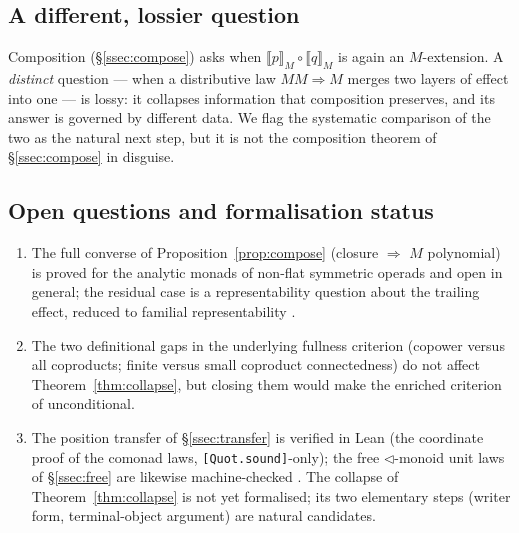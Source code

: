 \documentclass[11pt]{amsart}
\theoremstyle{plain}
\theoremstyle{definition}
\theoremstyle{remark}
\newcommand{\extM}[1]{\llbracket #1 \rrbracket_{M}}
\newcommand{\tri}{\triangleleft}
\begin{document}
\subsection*{A different, lossier question}
Composition (\S\ref{ssec:compose}) asks when $\extM{p}\circ\extM{q}$ is again an $M$-extension. A
\emph{distinct} question --- when a distributive law $MM\Rightarrow M$ merges two layers of effect into
one --- is lossy: it collapses information that composition preserves, and its answer is governed by
different data. We flag the systematic comparison of the two as the natural next step, but it is not
the composition theorem of \S\ref{ssec:compose} in disguise.

\subsection*{Open questions and formalisation status}
\begin{enumerate}[label=(\arabic*),leftmargin=2.2em]
  \item The full converse of Proposition~\ref{prop:compose} (closure $\Rightarrow$ $M$ polynomial) is
    proved for the analytic monads of non-flat symmetric operads and open in general; the residual
    case is a representability question about the trailing effect, reduced to familial
    representability \cite{MacBethCodensity}.
  \item The two definitional gaps in the underlying fullness criterion (copower versus all
    coproducts; finite versus small coproduct connectedness) do not affect
    Theorem~\ref{thm:collapse}, but closing them would make the enriched criterion of
    \cite{MacBethBase} unconditional.
  \item The position transfer of \S\ref{ssec:transfer} is verified in Lean (the coordinate proof of
    the comonad laws, \texttt{[Quot.sound]}-only); the free $\tri$-monoid unit laws of
    \S\ref{ssec:free} are likewise machine-checked \cite{MacBethBase}. The collapse of
    Theorem~\ref{thm:collapse} is not yet formalised; its two elementary steps (writer form,
    terminal-object argument) are natural candidates.
\end{enumerate}
\end{document}
